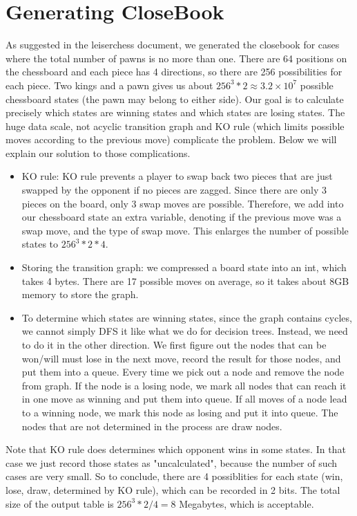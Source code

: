 \documentclass[10pt,twosidep]{article}
\begin{document}
\section{Generating CloseBook}
	As suggested in the leiserchess document, we generated the closebook 
	for cases where the total number of pawns is no more than one. 
	There are 64 positions on the chessboard and each piece has 4 directions, 
	so there are 256 possibilities for each piece. 
	Two kings and a pawn gives us about $256^3*2\approx 3.2\times 10^7$ possible chessboard states 
	(the pawn may belong to either side).
	Our goal is to calculate precisely which states are winning states and which states are losing states.
	The huge data scale, not acyclic transition graph and KO rule 
	(which limits possible moves according to the previous move) complicate the problem.
	Below we will explain our solution to those complications. 

	\begin{itemize}
	\item KO rule: KO rule prevents a player to swap back two pieces that are just swapped by the opponent 
	if no pieces are zagged. Since there are only 3 pieces on the board, only 3 swap moves are possible. 
	Therefore, we add into our chessboard state an extra variable, denoting if the previous move was a swap move, 
	and the type of swap move. This enlarges the number of possible states to $256^3*2*4$.
	\item Storing the transition graph: we compressed a board state into an int, which takes 4 bytes. 
	There are 17 possible moves on average, so it takes about 8GB memory to store the graph. 
	\item To determine which states are winning states, since the graph contains cycles, 
	we cannot simply DFS it like what we do for decision trees. Instead, 
	we need to do it in the other direction. 
	We first figure out the nodes that can be won/will must lose in the next move, 
	record the result for those nodes, and put them into a queue. 
	Every time we pick out a node and remove the node from graph. 
	If the node is a losing node, we mark all nodes that can reach it in one move as winning and put them into queue. 
	If all moves of a node lead to a winning node, we mark this node as losing and put it into queue. 
	The nodes that are not determined in the process are draw nodes. 
	\end{itemize}
	Note that KO rule does determines which opponent wins in some states. In that case 
	we just record those states as "uncalculated", because the number of such cases are very small.
	So to conclude, there are 4 possiblities for each state (win, lose, draw, determined by KO rule), 
	which can be recorded in 2 bits. The total size of the output table
	is $256^3*2/4=8$ Megabytes, which is acceptable.
	
\end{document}
